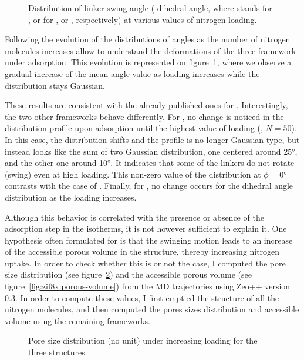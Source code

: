 \documentclass[thesis]{subfiles}
\begin{document}
\begin{figure}[ht]
    \centering
    
    \caption{Distribution of linker swing angle ( dihedral angle,
    where  stands for ,  or  for , \ZIFCl or
    \ZIFBr, respectively) at various values of nitrogen loading.}
    \label{fig:zif8x:dihedrals}
\end{figure}

Following the evolution of the distributions of angles as the number of nitrogen
molecules increases allow to understand the deformations of the three framework
under adsorption. This evolution is represented on
figure~\ref{fig:zif8x:dihedrals}, where we observe a gradual increase of the
mean angle value as loading increases while the distribution stays Gaussian.

These results are consistent with the already published ones for
\cite{Coudert2017}. Interestingly, the two other frameworks behave
differently. For \ZIFCl, no change is noticed in the distribution profile upon
adsorption until the highest value of loading (\ie, $N = 50$). In this case, the
distribution shifts and the profile is no longer Gaussian type, but instead
looks like the sum of two Gaussian distribution, one centered around 25°, and
the other one around 10°. It indicates that some of the linkers do not rotate
(swing) even at high loading. This non-zero value of the distribution at $\phi =
0\text{°}$ contrasts with the case of . Finally, for \ZIFBr, no change
occurs for the dihedral angle distribution as the loading increases.

Although this behavior is correlated with the presence or absence of the
adsorption step in the isotherms, it is not however sufficient to explain it.
One hypothesis often formulated for  is that the swinging motion leads to
an increase of the accessible porous volume in the structure, thereby increasing
nitrogen uptake. In order to check whether this is or not the case, I computed
the pore size distribution (see figure~\ref{fig:zif8x:pores-sizes}) and the
accessible porous volume (see figure~\ref{fig:zif8x:porous-volume}) from the MD
trajectories using Zeo++\cite{Willems2012} version 0.3. In order to compute
these values, I first emptied the structure of all the nitrogen molecules, and
then computed the pores sizes distribution and accessible volume using the
remaining frameworks.

\begin{figure}[ht]
    \centering
    
    \caption{Pore size distribution (no unit) under increasing loading for the
    three structures.}
    \label{fig:zif8x:pores-sizes}
\end{figure}
\end{document}
